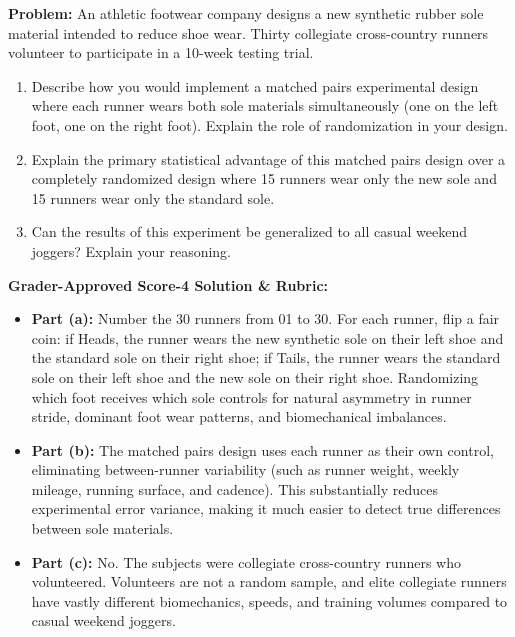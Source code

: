 \begin{frqrubricbox}
\textbf{Problem:} An athletic footwear company designs a new synthetic rubber sole material intended to reduce shoe wear. Thirty collegiate cross-country runners volunteer to participate in a 10-week testing trial.
\begin{enumerate}[label=(\alph*)]
  \item Describe how you would implement a matched pairs experimental design where each runner wears both sole materials simultaneously (one on the left foot, one on the right foot). Explain the role of randomization in your design.
  \item Explain the primary statistical advantage of this matched pairs design over a completely randomized design where 15 runners wear only the new sole and 15 runners wear only the standard sole.
  \item Can the results of this experiment be generalized to all casual weekend joggers? Explain your reasoning.
\end{enumerate}

\textbf{Grader-Approved Score-4 Solution \& Rubric:}
\begin{itemize}[leftmargin=1.2em]
  \item \textbf{Part (a):} Number the 30 runners from 01 to 30. For each runner, flip a fair coin: if Heads, the runner wears the new synthetic sole on their left shoe and the standard sole on their right shoe; if Tails, the runner wears the standard sole on their left shoe and the new sole on their right shoe. Randomizing which foot receives which sole controls for natural asymmetry in runner stride, dominant foot wear patterns, and biomechanical imbalances.
  \item \textbf{Part (b):} The matched pairs design uses each runner as their own control, eliminating between-runner variability (such as runner weight, weekly mileage, running surface, and cadence). This substantially reduces experimental error variance, making it much easier to detect true differences between sole materials.
  \item \textbf{Part (c):} No. The subjects were collegiate cross-country runners who volunteered. Volunteers are not a random sample, and elite collegiate runners have vastly different biomechanics, speeds, and training volumes compared to casual weekend joggers.
\end{itemize}
\end{frqrubricbox}


